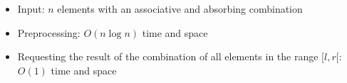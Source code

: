 \begin{itemize}
	\item Input: $n$ elements with an associative and absorbing combination
	\item Preprocessing: $O(n\log{n})$ time and space
	\item Requesting the result of the combination of all elements in the range $[l,r[$: $O(1)$ time and space
\end{itemize}
